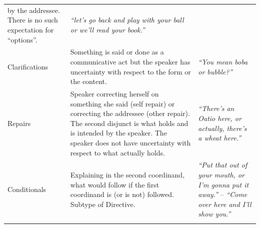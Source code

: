 \documentclass[oneside]{report}
\theoremstyle{definition}
\theoremstyle{definition}
\theoremstyle{definition}
\theoremstyle{remark}
\begin{document}
\begin{longtable}[]{@{}lll@{}}
\begin{minipage}[t]{0.44\columnwidth}
by the addressee. There is no such expectation for ``options''.\strut
\end{minipage} & \begin{minipage}[t]{0.33\columnwidth}\raggedright\strut
\emph{``let's go back and play with your ball or we'll read your
book.''}\strut
\end{minipage}\tabularnewline
\begin{minipage}[t]{0.14\columnwidth}\raggedright\strut
Clarifications\strut
\end{minipage} & \begin{minipage}[t]{0.44\columnwidth}\raggedright\strut
Something is said or done as a communicative act but the speaker has
uncertainty with respect to the form or the content.\strut
\end{minipage} & \begin{minipage}[t]{0.33\columnwidth}\raggedright\strut
\emph{``You mean boba or bubble?''}\strut
\end{minipage}\tabularnewline
\begin{minipage}[t]{0.14\columnwidth}\raggedright\strut
Repairs\strut
\end{minipage} & \begin{minipage}[t]{0.44\columnwidth}\raggedright\strut
Speaker correcting herself on something she said (self repair) or
correcting the addressee (other repair). The second disjunct is what
holds and is intended by the speaker. The speaker does not have
uncertainty with respect to what actually holds.\strut
\end{minipage} & \begin{minipage}[t]{0.33\columnwidth}\raggedright\strut
\emph{``There's an Oatio here, or actually, there's a wheat
here.''}\strut
\end{minipage}\tabularnewline
\begin{minipage}[t]{0.14\columnwidth}\raggedright\strut
Conditionals\strut
\end{minipage} & \begin{minipage}[t]{0.44\columnwidth}\raggedright\strut
Explaining in the second coordinand, what would follow if the first
coordinand is (or is not) followed. Subtype of Directive.\strut
\end{minipage} & \begin{minipage}[t]{0.33\columnwidth}\raggedright\strut
\emph{``Put that out of your mouth, or I'm gonna put it away.''} --
\emph{``Come over here and I'll show you.''}\strut
\end{minipage}\tabularnewline
\begin{minipage}[t]{0.14\columnwidth}\raggedright\strut

\end{minipage}
\end{longtable}
\end{document}

